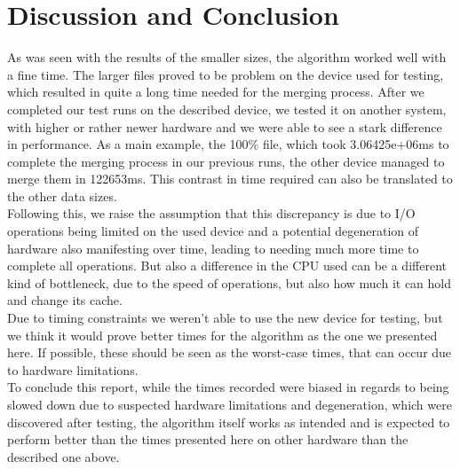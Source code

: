 \documentclass[twocolumn]{article}
\begin{document}
\section{Discussion and Conclusion}
As was seen with the results of the smaller sizes, the algorithm worked well with a fine time. The larger files proved to be problem on the device used for testing, which resulted in quite a long time needed for the merging process. After we completed our test runs on the described device, we tested it on another system, with higher or rather newer hardware and we were able to see a stark difference in performance. As a main example, the 100\% file, which took 3.06425e+06ms to complete the merging process in our previous runs, the other device managed to merge them in 122653ms. This contrast in time required can also be translated to the other data sizes.\\
Following this, we raise the assumption that this discrepancy is due to I/O operations being limited on the used device and a potential degeneration of hardware also manifesting over time, leading to needing much more time to complete all operations. But also a difference in the CPU used can be a different kind of bottleneck, due to the speed of operations, but also how much it can hold and change its cache.\\
Due to timing constraints we weren't able to use the new device for testing, but we think it would prove better times for the algorithm as the one we presented here. If possible, these should be seen as the worst-case times, that can occur due to hardware limitations.\\

To conclude this report, while the times recorded were biased in regards to being slowed down due to suspected hardware limitations and degeneration, which were discovered after testing, the algorithm itself works as intended and is expected to perform better than the times presented here on other hardware than the described one above.
\end{document}
